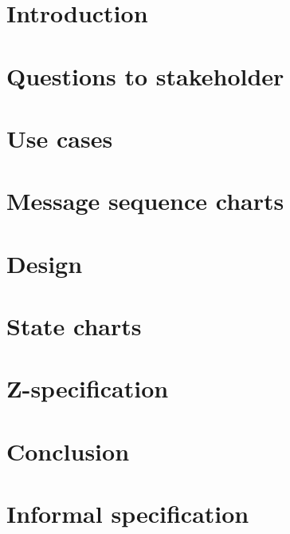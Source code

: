 \documentclass[a4paper,11pt]{article}
\begin{document}
	
	
	\tableofcontents
	\newpage
	
	\section{Introduction}
	
	\newpage

	\section{Questions to stakeholder}
	
	\newpage
	
	\section{Use cases}
	
	\newpage

	\section{Message sequence charts}
	
	\newpage

	\section{Design}
	
	\newpage

	\section{State charts}
	
	\newpage

	\section{Z-specification}
	
	\newpage

	\section{Conclusion}
	
	\newpage

	\appendix
	\section{Informal specification}
		\label{appendix:informal}
		
\end{document}
